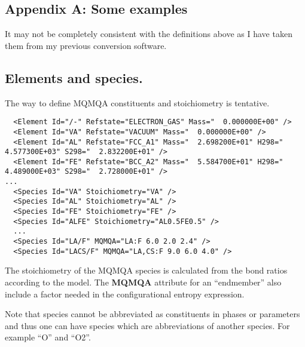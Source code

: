 \documentclass{article}
\begin{document}

\newpage 

\newpage
\begin{appendices}
\setcounter{equation}{0}
\renewcommand{\theequation}{A\arabic{equation}}
\setcounter{figure}{0}
\renewcommand{\thefigure}{A\arabic{figure}}

\section{Appendix A: Some examples}\label{sec:examples}

It may not be completely consistent with the definitions above as I
have taken them from my previous conversion software.

\subsection{Elements and species.}\label{sec:elementexample}

The way to define MQMQA constituents and stoichiometry is tentative.

{\small
\begin{verbatim}
  <Element Id="/-" Refstate="ELECTRON_GAS" Mass="  0.000000E+00" />
  <Element Id="VA" Refstate="VACUUM" Mass="  0.000000E+00" />
  <Element Id="AL" Refstate="FCC_A1" Mass="  2.698200E+01" H298="  4.577300E+03" S298="  2.832200E+01" />
  <Element Id="FE" Refstate="BCC_A2" Mass="  5.584700E+01" H298="  4.489000E+03" S298="  2.728000E+01" />
...
  <Species Id="VA" Stoichiometry="VA" />
  <Species Id="AL" Stoichiometry="AL" />
  <Species Id="FE" Stoichiometry="FE" />
  <Species Id="ALFE" Stoichiometry="AL0.5FE0.5" />
  ...
  <Species Id="LA/F" MQMQA="LA:F 6.0 2.0 2.4" />
  <Species Id="LACS/F" MQMQA="LA,CS:F 9.0 6.0 4.0" />
\end{verbatim}
}

The stoichiometry of the MQMQA species is calculated from the bond
ratios according to the model.  The {\bf MQMQA} attribute for an
``endmember'' also include a factor needed in the configurational
entropy expression.

Note that species cannot be abbreviated as constituents in phases or
parameters and thus one can have species which are abbreviations of
another species.  For example ``O'' and ``O2''.



\end{appendices}
\end{document}
